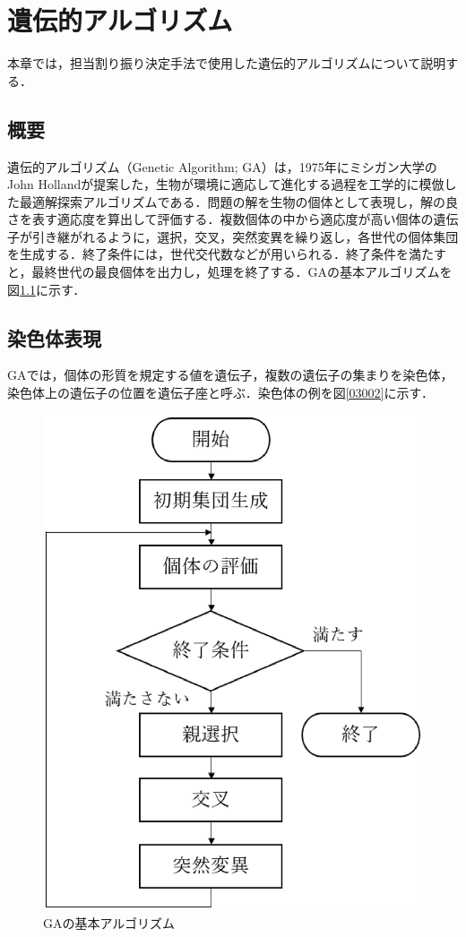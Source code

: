 \chapter{遺伝的アルゴリズム}
本章では，担当割り振り決定手法で使用した遺伝的アルゴリズムについて説明する．
\section{概要}
遺伝的アルゴリズム（Genetic Algorithm; GA）は，1975年にミシガン大学のJohn Hollandが提案した，生物が環境に適応して進化する過程を工学的に模倣した最適解探索アルゴリズムである．問題の解を生物の個体として表現し，解の良さを表す適応度を算出して評価する．複数個体の中から適応度が高い個体の遺伝子が引き継がれるように，選択，交叉，突然変異を繰り返し，各世代の個体集団を生成する．終了条件には，世代交代数などが用いられる．終了条件を満たすと，最終世代の最良個体を出力し，処理を終了する．GAの基本アルゴリズムを図\ref{03001}に示す．


\section{染色体表現}
GAでは，個体の形質を規定する値を遺伝子，複数の遺伝子の集まりを染色体，染色体上の遺伝子の位置を遺伝子座と呼ぶ．染色体の例を図\ref{03002}に示す．

\begin{figure}[htbp]
\begin{center}
\includegraphics[scale=0.5]{image/GA/03001.eps}
\caption{GAの基本アルゴリズム}
\label{03001}
\end{center}
\end{figure}

